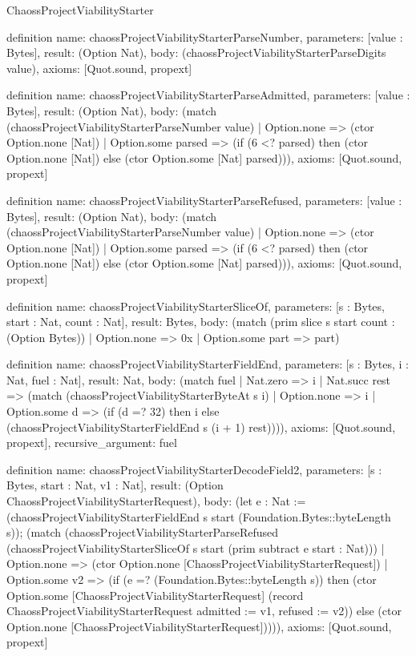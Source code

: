 \begin{lexlean}{ChaossProjectViabilityStarter}
\begin{semanticmodule}
definition{
  name: chaossProjectViabilityStarterParseNumber,
  parameters: [value : Bytes],
  result: (Option Nat),
  body: (chaossProjectViabilityStarterParseDigits value),
  axioms: [Quot.sound, propext]
}

definition{
  name: chaossProjectViabilityStarterParseAdmitted,
  parameters: [value : Bytes],
  result: (Option Nat),
  body: (match (chaossProjectViabilityStarterParseNumber value)
    | Option.none => (ctor Option.none [Nat])
    | Option.some parsed => (if (6 <? parsed) then (ctor Option.none [Nat]) else (ctor Option.some [Nat] parsed))),
  axioms: [Quot.sound, propext]
}

definition{
  name: chaossProjectViabilityStarterParseRefused,
  parameters: [value : Bytes],
  result: (Option Nat),
  body: (match (chaossProjectViabilityStarterParseNumber value)
    | Option.none => (ctor Option.none [Nat])
    | Option.some parsed => (if (6 <? parsed) then (ctor Option.none [Nat]) else (ctor Option.some [Nat] parsed))),
  axioms: [Quot.sound, propext]
}

definition{
  name: chaossProjectViabilityStarterSliceOf,
  parameters: [s : Bytes, start : Nat, count : Nat],
  result: Bytes,
  body: (match (prim slice s start count : (Option Bytes))
    | Option.none => 0x
    | Option.some part => part)
}

definition{
  name: chaossProjectViabilityStarterFieldEnd,
  parameters: [s : Bytes, i : Nat, fuel : Nat],
  result: Nat,
  body: (match fuel
    | Nat.zero => i
    | Nat.succ rest => (match (chaossProjectViabilityStarterByteAt s i)
      | Option.none => i
      | Option.some d => (if (d =? 32) then i else (chaossProjectViabilityStarterFieldEnd s (i + 1) rest)))),
  axioms: [Quot.sound, propext],
  recursive_argument: fuel
}

definition{
  name: chaossProjectViabilityStarterDecodeField2,
  parameters: [s : Bytes, start : Nat, v1 : Nat],
  result: (Option ChaossProjectViabilityStarterRequest),
  body: (let e : Nat := (chaossProjectViabilityStarterFieldEnd s start (Foundation.Bytes::byteLength s)); (match (chaossProjectViabilityStarterParseRefused (chaossProjectViabilityStarterSliceOf s start (prim subtract e start : Nat)))
    | Option.none => (ctor Option.none [ChaossProjectViabilityStarterRequest])
    | Option.some v2 => (if (e =? (Foundation.Bytes::byteLength s)) then (ctor Option.some [ChaossProjectViabilityStarterRequest] (record ChaossProjectViabilityStarterRequest {admitted := v1, refused := v2})) else (ctor Option.none [ChaossProjectViabilityStarterRequest])))),
  axioms: [Quot.sound, propext]
}


\end{semanticmodule}
\end{lexlean}
